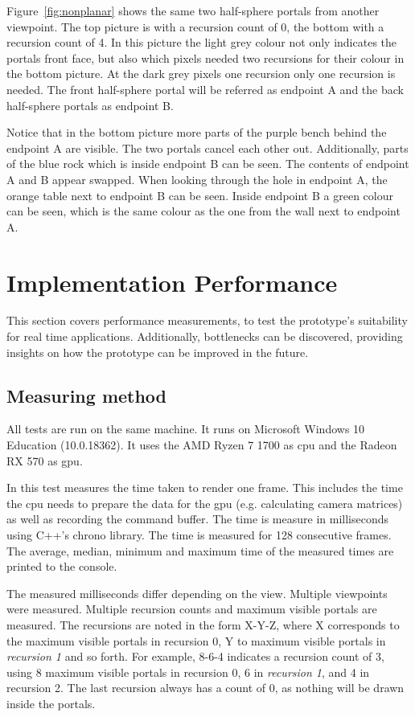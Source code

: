 Figure~\ref{fig:nonplanar} shows the same two half-sphere portals from another viewpoint. The top picture is with a recursion count of 0, the bottom with a recursion count of 4. In this picture the light grey colour not only indicates the portals front face, but also which pixels needed two recursions for their colour in the bottom picture. At the dark grey pixels one recursion only one recursion is needed. The front half-sphere portal will be referred as \gls{endpoint} A and the back half-sphere portals as \gls{endpoint} B.

Notice that in the bottom picture more parts of the purple bench behind the \gls{endpoint} A are visible. The two portals cancel each other out. Additionally, parts of the blue rock which is inside \gls{endpoint} B can be seen. The contents of \gls{endpoint} A and B appear swapped. When looking through the hole in \gls{endpoint} A, the orange table next to \gls{endpoint} B can be seen. Inside \gls{endpoint} B a green colour can be seen, which is the same colour as the one from the wall next to \gls{endpoint} A.

\section{Implementation Performance}
\label{section:performancemeasurement}

This section covers performance measurements, to test the prototype's suitability for real time applications. Additionally, bottlenecks can be discovered, providing insights on how the prototype can be improved in the future.

\subsection{Measuring method}
All tests are run on the same machine. It runs on Microsoft Windows 10 Education (10.0.18362). It uses the AMD Ryzen 7 1700 as \gls{cpu} and the Radeon RX 570 as \gls{gpu}.

In this test measures the time taken to render one frame. This includes the time the \gls{cpu} needs to prepare the data for the \gls{gpu} (e.g. calculating camera matrices) as well as recording the command buffer. The time is measure in milliseconds using C++'s chrono library. The time is measured for 128 consecutive frames. The average, median, minimum and maximum time of the measured times are printed to the console.


The measured milliseconds differ depending on the view. Multiple viewpoints were measured. Multiple recursion counts and maximum visible portals are measured. The recursions are noted in the form X-Y-Z, where X corresponds to the maximum visible portals in recursion 0, Y to maximum visible portals in \textit{recursion 1} and so forth. For example, 8-6-4 indicates a recursion count of 3, using 8 maximum visible portals in recursion 0, 6 in \textit{recursion 1}, and 4 in recursion 2. The last recursion always has a count of 0, as nothing will be drawn inside the portals. 

